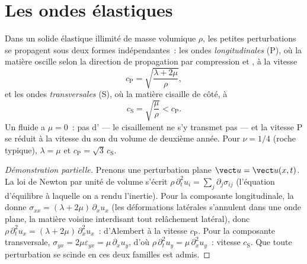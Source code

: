 \section{Les ondes élastiques}

\begin{proposition}\label{prop:b3:continuum-elasticity:waves}
Dans un solide élastique illimité de masse volumique $\rho$, les
petites perturbations se propagent sous deux formes indépendantes~:
les ondes \emph{longitudinales} (P), où la matière oscille selon la
direction de propagation par compression et , à la vitesse
\[
c_{\text{P}} = \sqrt{\frac{\lambda + 2\mu}{\rho}} ,
\]
et les ondes \emph{transversales} (S), où la matière cisaille de côté, à
\[
c_{\text{S}} = \sqrt{\frac{\mu}{\rho}} < c_{\text{P}} .
\]
Un fluide a $\mu = 0$~: pas d' --- le cisaillement ne s'y
transmet pas --- et la vitesse P se réduit à la vitesse du son du
volume de deuxième année. Pour $\nu = 1/4$ (roche typique), $\lambda = \mu$ et $c_{\text{P}} =
\sqrt3\,c_{\text{S}}$.
\end{proposition}

\begin{proof}[Démonstration partielle]
Prenons une perturbation plane $\vect u = \vect u(x, t)$. La loi de
Newton par unité de volume s'écrit $\rho\,\partial_t^2u_i = \sum_j\partial_j\sigma_{ij}$
(l'équation d'équilibre à laquelle on a rendu l'inertie). Pour la
composante longitudinale, la  donne $\sigma_{xx} = (\lambda +
2\mu)\,\partial_xu_x$ (les déformations latérales s'annulent dans une
onde plane, la matière voisine interdisant tout relâchement latéral),
donc $\rho\,\partial_t^2u_x = (\lambda + 2\mu)\,\partial_x^2u_x$~:
d'Alembert à la vitesse $c_{\text{P}}$. Pour la composante transversale, $\sigma_{yx} =
2\mu\varepsilon_{yx} = \mu\,\partial_xu_y$, d'où
$\rho\,\partial_t^2u_y = \mu\,\partial_x^2u_y$~: vitesse $c_{\text{S}}$.
Que toute perturbation se scinde en ces deux familles est admis.
\end{proof}

